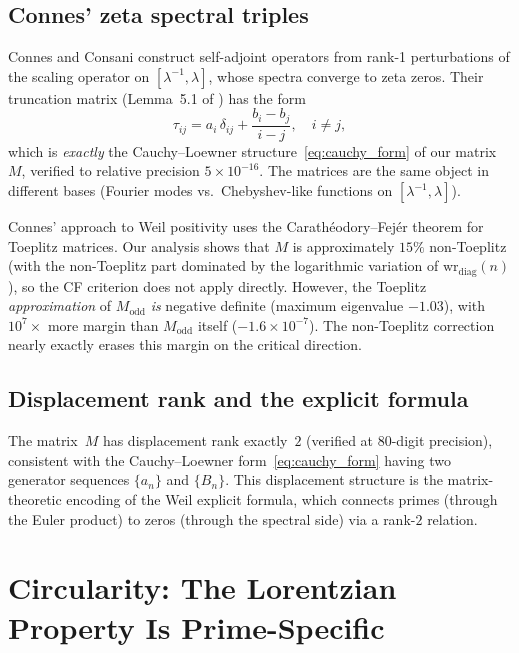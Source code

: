 \documentclass[11pt,a4paper]{article}
\begin{document}
\subsection{Connes' zeta spectral triples}

Connes and Consani \cite{CC2025} construct self-adjoint operators from rank-1 perturbations of the scaling operator on $[\lambda^{-1}, \lambda]$, whose spectra converge to zeta zeros. Their truncation matrix (Lemma~5.1 of \cite{CC2025}) has the form
\[
\tau_{ij} = a_i\, \delta_{ij} + \frac{b_i - b_j}{i - j}, \quad i \neq j,
\]
which is \emph{exactly} the Cauchy--Loewner structure~\eqref{eq:cauchy_form} of our matrix~$M$, verified to relative precision $5 \times 10^{-16}$. The matrices are the same object in different bases (Fourier modes vs.\ Chebyshev-like functions on $[\lambda^{-1}, \lambda]$).

Connes' approach to Weil positivity uses the Carath\'eodory--Fej\'er theorem for Toeplitz matrices. Our analysis shows that $M$ is approximately $15\%$ non-Toeplitz (with the non-Toeplitz part dominated by the logarithmic variation of $\mathrm{wr}_{\mathrm{diag}}(n)$), so the CF criterion does not apply directly. However, the Toeplitz \emph{approximation} of $M_{\mathrm{odd}}$ \emph{is} negative definite (maximum eigenvalue $-1.03$), with $10^7\times$ more margin than $M_{\mathrm{odd}}$ itself ($-1.6 \times 10^{-7}$). The non-Toeplitz correction nearly exactly erases this margin on the critical direction.

\subsection{Displacement rank and the explicit formula}

The matrix~$M$ has displacement rank exactly~$2$ (verified at $80$-digit precision), consistent with the Cauchy--Loewner form~\eqref{eq:cauchy_form} having two generator sequences $\{a_n\}$ and $\{B_n\}$. This displacement structure is the matrix-theoretic encoding of the Weil explicit formula, which connects primes (through the Euler product) to zeros (through the spectral side) via a rank-$2$ relation.

\section{Circularity: The Lorentzian Property Is Prime-Specific}\label{sec:circularity}
\end{document}
